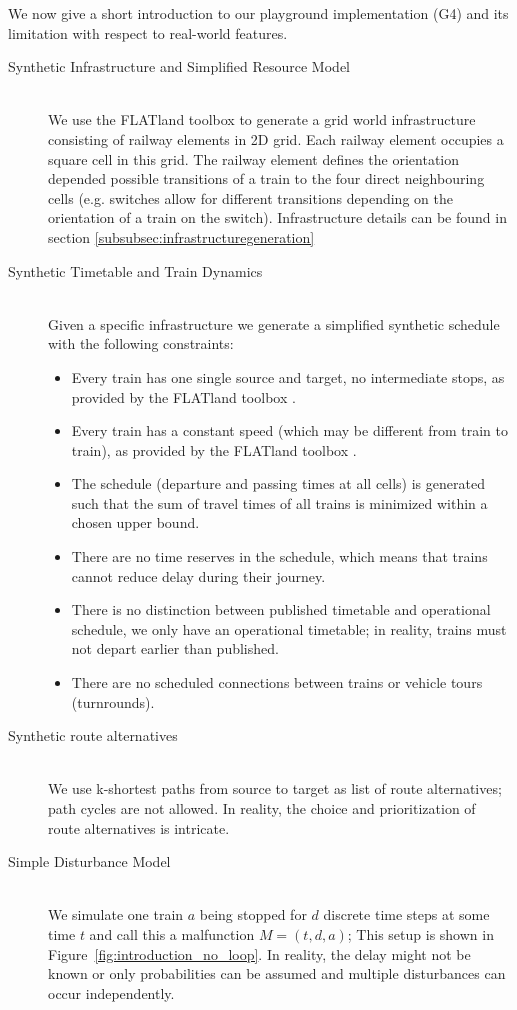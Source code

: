\documentclass{article}
\begin{document}
We now give a short introduction to our playground implementation (G4) and its limitation with respect to real-world features.
\begin{description}
\item[Synthetic Infrastructure and Simplified Resource Model] \hfill \\
We use the FLATland toolbox \cite{aicrowdFLATland} to generate a grid world infrastructure consisting of railway elements in 2D grid. Each railway element occupies a square cell in this grid. The railway element defines the orientation depended possible transitions of a train to the four direct neighbouring cells (e.g. switches allow for different transitions depending on the orientation of a train on the switch). Infrastructure details can be found in section \ref{subsubsec:infrastructuregeneration}
\item[Synthetic Timetable and Train Dynamics] \hfill \\
Given a specific infrastructure we generate a simplified synthetic schedule with the following constraints:
\begin{itemize}
    \item Every train has one single source and target, no intermediate stops, as provided by the FLATland toolbox \cite{aicrowdFLATland}.
    \item Every train has a constant speed (which may be different from train to train), as provided by the FLATland toolbox \cite{aicrowdFLATland}.
    \item The schedule (departure and passing times at all cells) is generated such that the sum of travel times of all trains is minimized within a chosen upper bound.
    \item There are no time reserves in the schedule, which means that trains cannot reduce delay during their journey.
    \item There is no distinction between published timetable and operational schedule, we only have an operational timetable; in reality, trains must not depart earlier than published.
    \item There are no scheduled connections between trains or vehicle tours (turnrounds).
\end{itemize}
\item[Synthetic route alternatives] \hfill \\
We use k-shortest paths from source to target as list of route alternatives; path cycles are not allowed. In reality, the choice and prioritization of route alternatives is intricate.
\item[Simple Disturbance Model] \hfill \\
We simulate one train $a$ being stopped for $d$ discrete time steps at some time $t$ and call this a malfunction $M=(t,d, a)$;  This setup is shown in Figure~\ref{fig:introduction_no_loop}. In reality, the delay might not be known or only probabilities can be assumed and multiple disturbances can occur independently.
\end{description}
\end{document}
